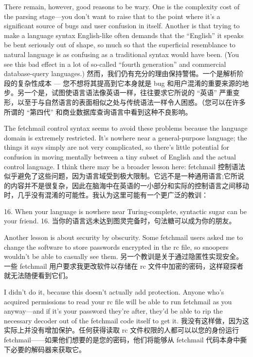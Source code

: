 \documentclass[a4paper,12pt,UTF8,twoside]{ctexbook}
\begin{document}
There remain, however, good reasons to be wary. One is the complexity cost of the parsing stage—you don't want to raise that to the point where it's a significant source of bugs and user confusion in itself. Another is that trying to make a language syntax English-like often demands that the ``English'' it speaks be bent seriously out of shape, so much so that the superficial resemblance to natural language is as confusing as a traditional syntax would have been. (You see this bad effect in a lot of so-called ``fourth generation'' and commercial database-query languages.)
然而，我们仍有充分的理由保持警惕。一个是解析阶段的复杂性成本 — 您不想将其提高到它本身就是 bug 和用户混淆的重要来源的地步。另一个是，试图使语言语法像英语一样，往往要求它所说的 “英语” 严重变形，以至于与自然语言的表面相似之处与传统语法一样令人困惑。（您可以在许多所谓的 “第四代” 和商业数据库查询语言中看到这种不良影响。

The fetchmail control syntax seems to avoid these problems because the language domain is extremely restricted. It's nowhere near a general-purpose language; the things it says simply are not very complicated, so there's little potential for confusion in moving mentally between a tiny subset of English and the actual control language. I think there may be a broader lesson here:
fetchmail 控制语法似乎避免了这些问题，因为语言域受到极大限制。它远不是一种通用语言;它所说的内容并不是很复杂，因此在脑海中在英语的一小部分和实际的控制语言之间移动时，几乎没有混淆的可能性。我认为这里可能有一个更广泛的教训：

16. When your language is nowhere near Turing-complete, syntactic sugar can be your friend.
16. 当你的语言远未达到图灵完备时，句法糖可以成为你的朋友。

Another lesson is about security by obscurity. Some fetchmail users asked me to change the software to store passwords encrypted in the rc file, so snoopers wouldn't be able to casually see them.
另一个教训是关于通过隐匿性实现安全。一些 fetchmail 用户要求我更改软件以存储在 rc 文件中加密的密码，这样窥探者就无法随便看到它们。

I didn't do it, because this doesn't actually add protection. Anyone who's acquired permissions to read your rc file will be able to run fetchmail as you anyway—and if it's your password they're after, they'd be able to rip the necessary decoder out of the fetchmail code itself to get it.
我没有这样做，因为这实际上并没有增加保护。任何获得读取 rc 文件权限的人都可以以您的身份运行 fetchmail——如果他们想要的是您的密码，他们将能够从 fetchmail 代码本身中撕下必要的解码器来获取它。
\end{document}
